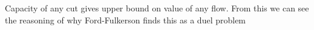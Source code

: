 

\begin{note}
	Capacity of any cut gives upper bound on value of any flow. From this we can see the reasoning of why Ford-Fulkerson finds this as a duel problem 
\end{note}

